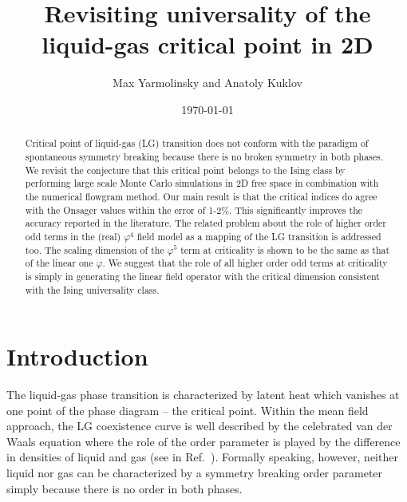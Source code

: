 \documentclass[prb,aps,twocolumn,groupedaddress,floats,showpacs,final]{revtex4}
\begin{document}
\author{Max Yarmolinsky and Anatoly Kuklov}
\address{$^1$ Department of Engineering \& Physics, CSI, and the Graduate Center of CUNY, New York.}




\title{Revisiting universality of the liquid-gas critical point in 2D}


\date{\today}
\begin{abstract}
Critical point of liquid-gas (LG) transition does not conform with the paradigm of spontaneous symmetry breaking because there is no broken symmetry in both phases. 
 We revisit the conjecture that this critical point belongs to the Ising class by performing large scale Monte Carlo simulations in 2D free space in combination with the numerical flowgram method.
 Our main result is that the critical indices do agree  with the Onsager values within the error of 1-2\%. This significantly improves the accuracy reported in the literature. 
The related problem about the role of higher order odd terms in the (real) $\varphi^4$ field model as a mapping of the LG transition is addressed too. 
The scaling dimension of the $\varphi^5$ term at criticality is shown to be the same as that of the linear one $\varphi$. 
 We suggest that the role of all higher order odd terms at criticality is simply in generating the linear field operator with the critical dimension consistent with the Ising universality class.  
\end{abstract}


\maketitle

\section{Introduction}
The liquid-gas phase transition is characterized by latent heat which vanishes at one point of the phase diagram -- the critical point. Within the mean field approach, the LG coexistence curve is well described by the celebrated van der Waals equation  where the role of the order parameter is played by the difference in densities of liquid and gas (see in Ref.~\cite{Landau}).  Formally speaking, however, neither liquid nor gas can be characterized by a symmetry breaking order parameter simply  because there is no order in both phases.   
\end{document}
